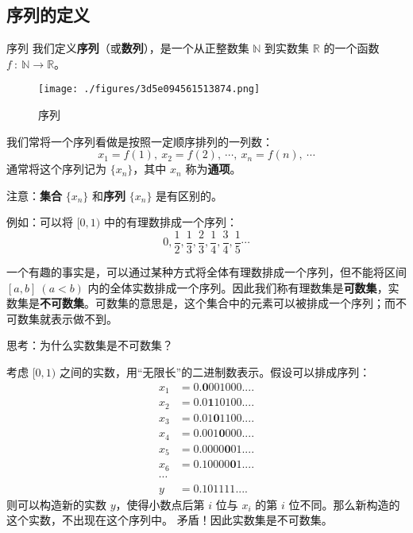 
\begin{issues}
\issueTODO
\issueDraft
\end{issues}

\subsection{序列的定义}
\begin{definition}{序列}
我们定义\textbf{序列}（或\textbf{数列}），是一个从正整数集 $\mathbb{N}$  到实数集 $\mathbb{R}$ 的一个函数 $f\ :\ \mathbb{N}\rightarrow \mathbb{R}$。
\end{definition}
\begin{figure}[ht]
\centering
\texttt{[image: ./figures/3d5e094561513874.png]}
\caption{序列} \label{fig_seq_1}
\end{figure}
我们常将一个序列看做是按照一定顺序排列的一列数：
$$
x_1=f(1),\ x_2=f(2),\ \cdots,\ x_n=f(n),\ \cdots
$$
通常将这个序列记为 $\{x_n\}$，其中 $x_n$ 称为\textbf{通项}。

注意：\textbf{集合} $\{x_n\}$ 和\textbf{序列} $\{x_n\}$ 是有区别的。

例如：可以将 $[0,1)$ 中的有理数排成一个序列：
$$
0,\frac{1}{2},\frac{1}{3},\frac{2}{3},\frac{1}{4},\frac{3}{4},\frac{1}{5}\cdots
$$

一个有趣的事实是，可以通过某种方式将全体有理数排成一个序列，但不能将区间 $[a,b]\ (a<b)$ 内的全体实数排成一个序列。因此我们称有理数集是\textbf{可数集}，实数集是\textbf{不可数集}。可数集的意思是，这个集合中的元素可以被排成一个序列；而不可数集就表示做不到。

\begin{example}{}
思考：为什么实数集是不可数集？

考虑 $[0,1)$ 之间的实数，用“无限长”的二进制数表示。假设可以排成序列： 
\begin{equation}
\begin{aligned}
x_1&=0.\boldsymbol 0001000....\\
x_2&=0.0\boldsymbol 110100....\\
x_3&=0.01\boldsymbol 01100....\\
x_4&=0.001\boldsymbol 0000....\\
x_5&=0.0000\boldsymbol 001....\\
x_6&=0.10000\boldsymbol 01....\\
\cdots
\\
y&=0.101111....
\end{aligned}
\end{equation}
​则可以构造新的实数 $y$，使得小数点后第 $i$ 位与 $x_i$ 的第 $i$ 位不同。那么新构造的这个实数，不出现在这个序列中。
矛盾！因此实数集是不可数集。
\end{example}

​		

​		
